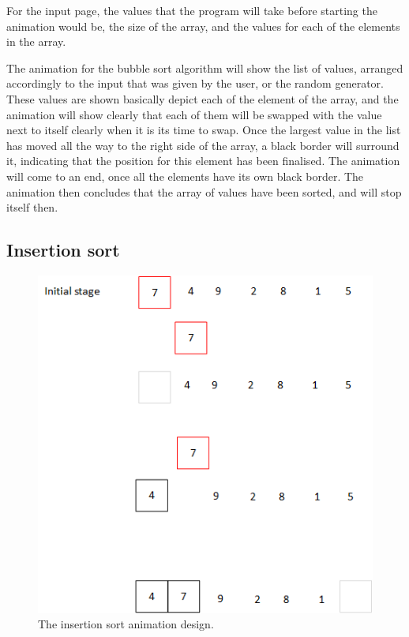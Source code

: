 For the input page, the values that the program will take before starting the animation would be, the size of the array, and the values for each of the elements in the array.

The animation for the bubble sort algorithm will show the list of values, arranged accordingly to the input that was given by the user, or the random generator. These values are shown basically depict each of the element of the array, and the animation will show clearly that each of them will be swapped with the value next to itself clearly when it is its time to swap. Once the largest value in the list has moved all the way to the right side of the array, a black border will surround it, indicating that the position for this element has been finalised. The animation will come to an end, once all the elements have its own black border. The animation then concludes that the array of values have been sorted, and will stop itself then.

%

\subsection{Insertion sort}

\begin{figure}[H]
\centering
\includegraphics[scale=0.9]{images/report_images/animationDesignInsertionSort.png}
\caption{The insertion sort animation design.}
\label{animationDesignInsertionSort}
\end{figure}

